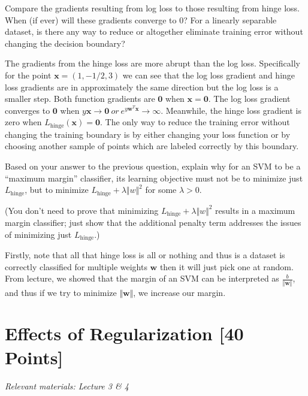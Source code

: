 \problem[4]
Compare the gradients resulting from log loss to those resulting from hinge loss. When (if ever) will these gradients converge to 0? For a linearly separable dataset, is there any way to reduce or altogether eliminate training error without changing the decision boundary?

\begin{solution}
  The gradients from the hinge loss are more abrupt than the log loss. Specifically for the point $\mathbf{x} = (1, -1/2, 3)$ we can see that the log loss gradient and hinge loss gradients are in approximately the same direction but the log loss is a smaller step. Both function gradients are $\mathbf{0}$ when $\mathbf{x} = \mathbf{0}$. The log loss gradient converges to $\mathbf{0}$ when $y\mathbf{x} \to \mathbf{0} \ or \ e^{y\mathbf{w}^T\mathbf{x}} \to \infty$. Meanwhile, the hinge loss gradient is zero when $L_{\text{hinge}}(\mathbf{x}) = \mathbf{0}$. The only way to reduce the training error without changing the training boundary is by either changing your loss function or by choosing another sample of points which are labeled correctly by this boundary.
\end{solution}

\problem[5]
Based on your answer to the previous question, explain why for an SVM to be a ``maximum margin'' classifier, its learning objective must not be to minimize just $L_\text{hinge}$, but to minimize $L_\text{hinge} + \lambda\Vert w \Vert^2$ for some $\lambda > 0$.

(You don't need to prove that minimizing $L_\text{hinge} + \lambda\Vert w \Vert^2$ results in a maximum margin classifier; just show that the additional penalty term addresses the issues of minimizing just $L_\text{hinge}$.)

\begin{solution}
  Firstly, note that all that hinge loss is all or nothing and thus is a dataset is correctly classified for multiple weights $\mathbf{w}$ then it will just pick one at random. From lecture, we showed that the margin of an SVM can be interpreted as $\frac{b}{\Vert\mathbf{w}\Vert}$, and thus if we try to minimize $\Vert\mathbf{w}\Vert$, we increase our margin.
\end{solution}


\newpage
\section{Effects of Regularization [40 Points]}
\textit{Relevant materials: Lecture 3 \& 4}

